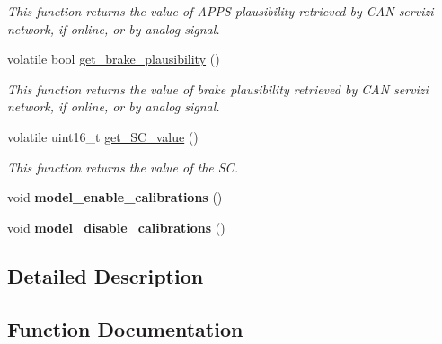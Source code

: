 \begin{DoxyCompactItemize}
\begin{DoxyCompactList}\small\item\em This function returns the value of A\+P\+PS plausibility retrieved by C\+AN servizi network, if online, or by analog signal. \end{DoxyCompactList}\item 
volatile bool \mbox{\hyperlink{group___board__model__group_gad47b702f79115e19d75b22f39b45efeb}{get\+\_\+brake\+\_\+plausibility}} ()
\begin{DoxyCompactList}\small\item\em This function returns the value of brake plausibility retrieved by C\+AN servizi network, if online, or by analog signal. \end{DoxyCompactList}\item 
volatile uint16\+\_\+t \mbox{\hyperlink{group___board__model__group_ga36eddbc000c8d1820fd2a644a39c87ea}{get\+\_\+\+S\+C\+\_\+value}} ()
\begin{DoxyCompactList}\small\item\em This function returns the value of the SC. \end{DoxyCompactList}\item 
\mbox{\label{group___board__model__group_ga56b9cca331f294c3249df72b9f37ff2a}} 
void {\bfseries model\+\_\+enable\+\_\+calibrations} ()
\item 
\mbox{\label{group___board__model__group_ga8ce089b65afda1dee23f7ecefd0cb873}} 
void {\bfseries model\+\_\+disable\+\_\+calibrations} ()
\end{DoxyCompactItemize}


\subsection{Detailed Description}


\subsection{Function Documentation}
\mbox{\label{group___board__model__group_gae0acabf32ee7f2a82b2f9149ba3d1978}} 
